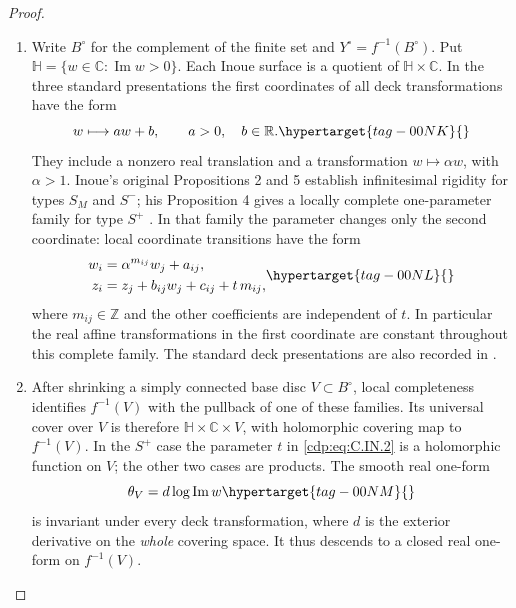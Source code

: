\begin{proof}

\begin{enumerate}[leftmargin=*]
\item Write $B^\circ$ for the complement of the
finite set and $Y^\circ=f^{-1}(B^\circ)$. Put
$\mathbb H=\{w\in\mathbb C:\operatorname{Im}w>0\}$.
Each Inoue surface is a quotient of $\mathbb H\times\mathbb C$.
In the three standard presentations the first coordinates of all
deck transformations have the form
\begin{equation}
 w\longmapsto a w+b,\qquad a>0,\quad b\in\mathbb R.
\hypertarget{tag-00NK}{}\label{cdp:eq:C.IN.1}
\end{equation}
They include a nonzero real translation and a transformation
$w\mapsto\alpha w$, with $\alpha>1$. Inoue's original
Propositions 2 and 5 establish infinitesimal rigidity for types
$S_M$ and $S^{-}$; his Proposition 4 gives a locally complete
one-parameter family for type $S^{+}$
\cite[pp.~274, 278, 280]{Inoue1974}.
In that family the parameter changes only the second coordinate:
local coordinate transitions have the form
\begin{equation}
\begin{aligned}
 w_i&=\alpha^{m_{ij}}w_j+a_{ij},\\
 z_i&=z_j+b_{ij}w_j+c_{ij}+t\,m_{ij},
\end{aligned}
\hypertarget{tag-00NL}{}\label{cdp:eq:C.IN.2}
\end{equation}
where $m_{ij}\in\mathbb Z$ and the other coefficients are
independent of $t$. In particular the real affine transformations
in the first coordinate are constant throughout this complete
family. The standard deck presentations are also recorded in
\cite[Sections 2.1--2.3]{KhaledTeleman2026}.

\item After shrinking a simply connected base disc $V\subset B^\circ$,
local completeness identifies $f^{-1}(V)$ with the pullback of one
of these families. Its universal cover over $V$ is therefore
$\mathbb H\times\mathbb C\times V$, with holomorphic covering
map to $f^{-1}(V)$. In the $S^{+}$ case the parameter $t$ in
\eqref{cdp:eq:C.IN.2} is a holomorphic function on $V$; the other two cases
are products. The smooth real one-form
\begin{equation}
 \theta_V=d\log\operatorname{Im}w
\hypertarget{tag-00NM}{}\label{cdp:eq:C.IN.3}
\end{equation}
is invariant under every deck transformation, where $d$ is the
exterior derivative on the \emph{whole} covering space. It thus
descends to a closed real one-form on $f^{-1}(V)$.


\end{enumerate}
\end{proof}
